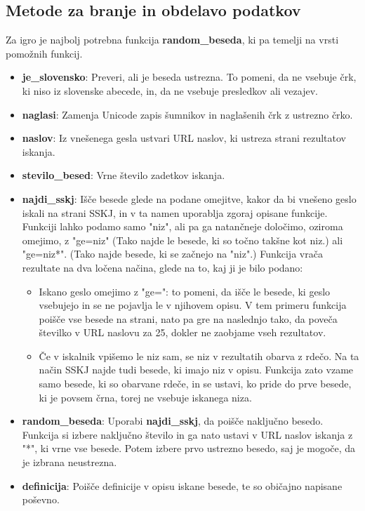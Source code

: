 \documentclass [a4paper, 12pt] {article}
\begin{document}
\subsection {Metode za branje in obdelavo podatkov}
Za igro je najbolj potrebna funkcija \textbf {random\_beseda}, ki pa temelji na vrsti pomožnih funkcij.
\begin {itemize}
\item \textbf {je\_slovensko}: Preveri, ali je beseda ustrezna. To pomeni, da ne vsebuje črk, ki niso iz slovenske abecede, in, da ne vsebuje presledkov ali vezajev.
\item \textbf {naglasi}: Zamenja Unicode zapis šumnikov in naglašenih črk z ustrezno črko.
\item \textbf {naslov}: Iz vnešenega gesla ustvari URL naslov, ki ustreza strani rezultatov iskanja.
\item \textbf {stevilo\_besed}: Vrne število zadetkov iskanja.
\item \textbf {najdi\_sskj}: Išče besede glede na podane omejitve, kakor da bi vnešeno geslo iskali na strani SSKJ, in v ta namen uporablja zgoraj opisane funkcije. Funkciji lahko podamo samo "niz", ali pa ga natančneje določimo, oziroma omejimo, z "ge=niz" (Tako najde le besede, ki so točno takšne kot niz.) ali "ge=niz*". (Tako najde besede, ki se začnejo na "niz".) Funkcija vrača rezultate na dva ločena načina, glede na to, kaj ji je bilo podano:
\begin {itemize}
\item Iskano geslo omejimo z "ge=": to pomeni, da išče le besede, ki geslo vsebujejo in se ne pojavlja le v njihovem opisu. V tem primeru funkcija poišče vse besede na strani, nato pa gre na naslednjo tako, da poveča številko v URL naslovu za 25, dokler ne zaobjame vseh rezultatov.
\item Če v iskalnik vpišemo le niz sam, se niz v rezultatih obarva z rdečo. Na ta način SSKJ najde tudi besede, ki imajo niz v opisu. Funkcija zato vzame samo besede, ki so obarvane rdeče, in se ustavi, ko pride do prve besede, ki je povsem črna, torej ne vsebuje iskanega niza.
\end {itemize}
\item \textbf {random\_beseda}: Uporabi \textbf {najdi\_sskj}, da poišče naključno besedo. Funkcija si izbere naključno število in ga nato ustavi v URL naslov iskanja z "*", ki vrne vse besede. Potem izbere prvo ustrezno besedo, saj je mogoče, da je izbrana neustrezna.
\item \textbf {definicija}: Poišče definicije v opisu iskane besede, te so običajno napisane poševno.
\end {itemize} 
\end{document}
